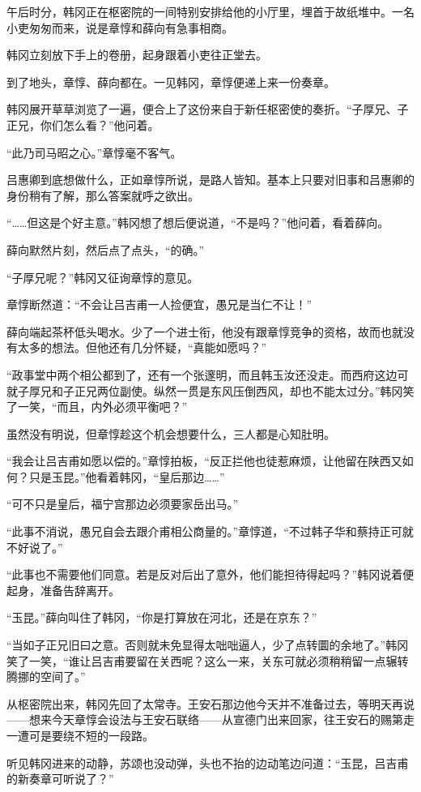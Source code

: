 午后时分，韩冈正在枢密院的一间特别安排给他的小厅里，埋首于故纸堆中。一名小吏匆匆而来，说是章惇和薛向有急事相商。

韩冈立刻放下手上的卷册，起身跟着小吏往正堂去。

到了地头，章惇、薛向都在。一见韩冈，章惇便递上来一份奏章。

韩冈展开草草浏览了一遍，便合上了这份来自于新任枢密使的奏折。“子厚兄、子正兄，你们怎么看？”他问着。

“此乃司马昭之心。”章惇毫不客气。

吕惠卿到底想做什么，正如章惇所说，是路人皆知。基本上只要对旧事和吕惠卿的身份稍有了解，那么答案就呼之欲出。

“……但这是个好主意。”韩冈想了想后便说道，“不是吗？”他问着，看着薛向。

薛向默然片刻，然后点了点头，“的确。”

“子厚兄呢？”韩冈又征询章惇的意见。

章惇断然道：“不会让吕吉甫一人捡便宜，愚兄是当仁不让！”

薛向端起茶杯低头喝水。少了一个进士衔，他没有跟章惇竞争的资格，故而也就没有太多的想法。但他还有几分怀疑，“真能如愿吗？”

“政事堂中两个相公都到了，还有一个张邃明，而且韩玉汝还没走。而西府这边可就子厚兄和子正兄两位副使。纵然一贯是东风压倒西风，却也不能太过分。”韩冈笑了一笑，“而且，内外必须平衡吧？”

虽然没有明说，但章惇趁这个机会想要什么，三人都是心知肚明。

“我会让吕吉甫如愿以偿的。”章惇拍板，“反正拦他也徒惹麻烦，让他留在陕西又如何？只是玉昆。”他看着韩冈，“皇后那边……”

“可不只是皇后，福宁宫那边必须要家岳出马。”

“此事不消说，愚兄自会去跟介甫相公商量的。”章惇道，“不过韩子华和蔡持正可就不好说了。”

“此事也不需要他们同意。若是反对后出了意外，他们能担待得起吗？”韩冈说着便起身，准备告辞离开。

“玉昆。”薛向叫住了韩冈，“你是打算放在河北，还是在京东？”

“当如子正兄旧曰之意。否则就未免显得太咄咄逼人，少了点转圜的余地了。”韩冈笑了一笑，“谁让吕吉甫要留在关西呢？这么一来，关东可就必须稍稍留一点辗转腾挪的空间了。”

从枢密院出来，韩冈先回了太常寺。王安石那边他今天并不准备过去，等明天再说——想来今天章惇会设法与王安石联络——从宣德门出来回家，往王安石的赐第走一遭可是要绕不短的一段路。

听见韩冈进来的动静，苏颂也没动弹，头也不抬的边动笔边问道：“玉昆，吕吉甫的新奏章可听说了？”

